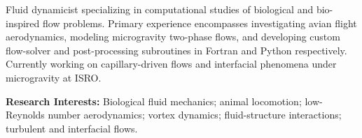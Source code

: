 

\begin{cvparagraph}
    Fluid dynamicist specializing in computational studies of biological and bio-inspired flow problems. Primary experience encompasses investigating avian flight aerodynamics, modeling microgravity two-phase flows, and developing custom flow-solver and post-processing
subroutines in Fortran and Python respectively. Currently working on capillary-driven flows and interfacial phenomena under microgravity at ISRO.\\
\vspace{-0.5cm}

\textbf{Research Interests:} Biological fluid mechanics; animal locomotion; low-Reynolds number aerodynamics; vortex dynamics; fluid-structure interactions; turbulent and interfacial flows.
\vspace{-0.25cm}
\end{cvparagraph}